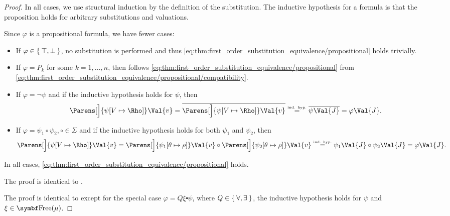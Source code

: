 \begin{proof}
  In all cases, we use structural induction by the definition of the substitution\IND. The inductive hypothesis for a formula is that the proposition holds for arbitrary substitutions and valuations.

   Since \( \varphi \) is a propositional formula, we have fewer cases:
  \begin{itemize}
    \item If \( \varphi \in \Set{ \top, \bot } \), no substitution is performed and thus \eqref{eq:thm:first_order_substitution_equivalence/propositional} holds trivially.

    \item If \( \varphi = P_k \) for some \( k = 1, \ldots, n \), then follows \eqref{eq:thm:first_order_substitution_equivalence/propositional} from \eqref{eq:thm:first_order_substitution_equivalence/propositional/compatibility}.

    \item If \( \varphi = \neg \psi \) and if the inductive hypothesis holds for \( \psi \), then
    \begin{equation*}
      \Parens[\Big]{ \psi[V \mapsto \Rho] }\Val{v}
      =
      \Ol{\Parens[\Big]{ \psi[V \mapsto \Rho] }\Val{v}}
      \overset {\IndHyp} =
      \Ol{\psi \Val{J}}
      =
      \varphi \Val{J}.
    \end{equation*}

    \item If \( \varphi = \psi_1 \circ \psi_2, \circ \in \Sigma \) and if the inductive hypothesis holds for both \( \psi_1 \) and \( \psi_2 \), then
    \begin{equation*}
      \Parens[\Big]{ \psi[V \mapsto \Rho] }\Val{v}
      =
      \Parens[\Big]{ \psi_1[\theta \mapsto \rho] }\Val{v} \circ \Parens[\Big]{ \psi_2[\theta \mapsto \rho] }\Val{v}
      \overset {\IndHyp} =
      \psi_1 \Val{J} \circ \psi_2\Val{J}
      =
      \varphi\Val{J}.
    \end{equation*}
  \end{itemize}

  In all cases, \eqref{eq:thm:first_order_substitution_equivalence/propositional} holds.

   The proof is identical to .

   The proof is identical to  except for the special case \( \varphi = Q \xi \centerdot \psi \), where \( Q \in \Set{ \forall, \exists } \), the inductive hypothesis holds for \( \psi \) and \( \xi \in \Bold{Free}(\mu) \).


\end{proof}
